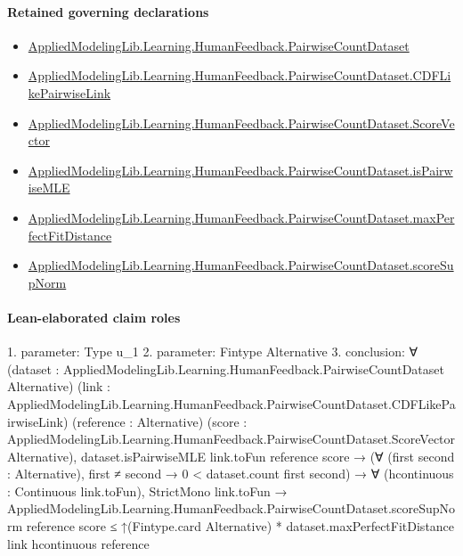 \documentclass[10pt]{article}
\begin{document}
\paragraph{Retained governing declarations}
\begin{itemize}\raggedright
\item \hyperlink{governing-declaration-2ba23f394a8d08a2}{Applied\allowbreak{}Modeling\allowbreak{}Lib.\allowbreak{}Learning.\allowbreak{}Human\allowbreak{}Feedback.\allowbreak{}Pairwise\allowbreak{}Count\allowbreak{}Dataset}
\item \hyperlink{governing-declaration-3449f3559185d0fd}{Applied\allowbreak{}Modeling\allowbreak{}Lib.\allowbreak{}Learning.\allowbreak{}Human\allowbreak{}Feedback.\allowbreak{}Pairwise\allowbreak{}Count\allowbreak{}Dataset.\allowbreak{}CDF\allowbreak{}Like\allowbreak{}Pairwise\allowbreak{}Link}
\item \hyperlink{governing-declaration-87eda978eb1b0c9d}{Applied\allowbreak{}Modeling\allowbreak{}Lib.\allowbreak{}Learning.\allowbreak{}Human\allowbreak{}Feedback.\allowbreak{}Pairwise\allowbreak{}Count\allowbreak{}Dataset.\allowbreak{}Score\allowbreak{}Vector}
\item \hyperlink{governing-declaration-cba21d23e0e5aa10}{Applied\allowbreak{}Modeling\allowbreak{}Lib.\allowbreak{}Learning.\allowbreak{}Human\allowbreak{}Feedback.\allowbreak{}Pairwise\allowbreak{}Count\allowbreak{}Dataset.\allowbreak{}is\allowbreak{}Pairwise\allowbreak{}MLE}
\item \hyperlink{governing-declaration-c351cbfc85b673f3}{Applied\allowbreak{}Modeling\allowbreak{}Lib.\allowbreak{}Learning.\allowbreak{}Human\allowbreak{}Feedback.\allowbreak{}Pairwise\allowbreak{}Count\allowbreak{}Dataset.\allowbreak{}max\allowbreak{}Perfect\allowbreak{}Fit\allowbreak{}Distance}
\item \hyperlink{governing-declaration-a7b530c7a57307cd}{Applied\allowbreak{}Modeling\allowbreak{}Lib.\allowbreak{}Learning.\allowbreak{}Human\allowbreak{}Feedback.\allowbreak{}Pairwise\allowbreak{}Count\allowbreak{}Dataset.\allowbreak{}score\allowbreak{}Sup\allowbreak{}Norm}
\end{itemize}
\paragraph{Lean-elaborated claim roles}\begin{ReviewVerbatim}
1. parameter: Type u_1
2. parameter: Fintype Alternative
3. conclusion: ∀ (dataset : AppliedModelingLib.Learning.HumanFeedback.PairwiseCountDataset Alternative)
  (link : AppliedModelingLib.Learning.HumanFeedback.PairwiseCountDataset.CDFLikePairwiseLink) (reference : Alternative)
  (score : AppliedModelingLib.Learning.HumanFeedback.PairwiseCountDataset.ScoreVector Alternative),
  dataset.isPairwiseMLE link.toFun reference score →
    (∀ (first second : Alternative), first ≠ second → 0 < dataset.count first second) →
      ∀ (hcontinuous : Continuous link.toFun),
        StrictMono link.toFun →
          AppliedModelingLib.Learning.HumanFeedback.PairwiseCountDataset.scoreSupNorm reference score ≤
            ↑(Fintype.card Alternative) * dataset.maxPerfectFitDistance link hcontinuous reference
\end{ReviewVerbatim}
\end{document}
